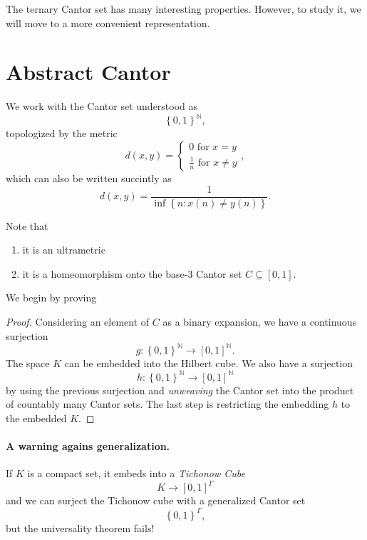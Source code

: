 The ternary Cantor set has many interesting properties. However, to study it, we will move to a more convenient representation.

\section{Abstract Cantor}

We work with the Cantor set understood as
\[ 
    \left\{ 0,1  \right\}^{ \mathbb{N} },
\]
topologized by the metric
\[ 
    d(x,y) = 
    \begin{cases}
        0 \text{ for } x = y \\
        \frac{1}{n}\text{ for } x \neq y
   \end{cases},
\]
which can also be written succintly as
\[ 
    d(x,y) = \frac{1}{\inf \left\{ n : x(n) \neq y(n) \right\}}.
\]

Note that
\begin{enumerate}
    \item it is an ultrametric
    \item it is a homeomorphism onto the base-3 Cantor set \( C \subseteq [0,1] \).
\end{enumerate}

We begin by proving

\begin{proof}
Considering an element of \( C \) as a binary expansion, we have a continuous surjection
\[ 
    g: \left\{ 0,1 \right\}^{ \mathbb{N} } \to [0,1]^{ \mathbb{N} }.
\]
The space \( K \) can be embedded into the Hilbert cube. We also have a surjection
\[ 
    h: \left\{ 0,1 \right\}^{ \mathbb{N} } \to [0,1]^{ \mathbb{N} }
\]
by using the previous surjection and \emph{unweaving} the Cantor set into the product of countably many Cantor sets. The last step is restricting the embedding \( h \) to the embedded \( K \).
\end{proof}

\paragraph{A warning agains generalization.} If \( K \) is a compact set, it embeds into a \emph{Tichonow Cube}
\[ 
    K \to [0,1]^\Gamma 
\]
and we can surject the Tichonow cube with a generalized Cantor set
\[ 
    \left\{ 0,1 \right\}^{\Gamma},
\]
but the universality theorem fails!

